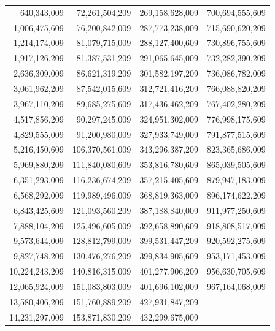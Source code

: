 \documentclass[12pt, twoside]{amsart}
\theoremstyle{definition}
\begin{document}
\begin{longtable}{rrrr}
640,343,009 & 72,261,504,209 & 269,158,628,009 & 700,694,555,609 \\
1,006,475,609 & 76,200,842,009 & 287,773,238,009 & 715,690,620,209 \\
1,214,174,009 & 81,079,715,009 & 288,127,400,609 & 730,896,755,609 \\
1,917,126,209 & 81,387,531,209 & 291,065,645,009 & 732,282,390,209 \\
2,636,309,009 & 86,621,319,209 & 301,582,197,209 & 736,086,782,009 \\
3,061,962,209 & 87,542,015,609 & 312,721,416,209 & 766,088,820,209 \\
3,967,110,209 & 89,685,275,609 & 317,436,462,209 & 767,402,280,209 \\
4,517,856,209 & 90,297,245,009 & 324,951,302,009 & 776,998,175,609 \\
4,829,555,009 & 91,200,980,009 & 327,933,749,009 & 791,877,515,609 \\
5,216,450,609 & 106,370,561,009 & 343,296,387,209 & 823,365,686,009 \\
5,969,880,209 & 111,840,080,609 & 353,816,780,609 & 865,039,505,609 \\
6,351,293,009 & 116,236,674,209 & 357,215,405,609 & 879,947,183,009 \\
6,568,292,009 & 119,989,496,009 & 368,819,363,009 & 896,174,622,209 \\
6,843,425,609 & 121,093,560,209 & 387,188,840,009 & 911,977,250,609 \\
7,888,104,209 & 125,496,605,009 & 392,658,890,609 & 918,808,517,009 \\
9,573,644,009 & 128,812,799,009 & 399,531,447,209 & 920,592,275,609 \\
9,827,748,209 & 130,476,276,209 & 399,834,905,609 & 953,171,453,009 \\
10,224,243,209 & 140,816,315,009 & 401,277,906,209 & 956,630,705,609 \\
12,065,924,009 & 151,083,803,009 & 401,696,102,009 & 967,164,068,009 \\
13,580,406,209 & 151,760,889,209 & 427,931,847,209 &  \\
14,231,297,009 & 153,871,830,209 & 432,299,675,009 &  \\

\bottomrule
\end{longtable}
\end{document}
